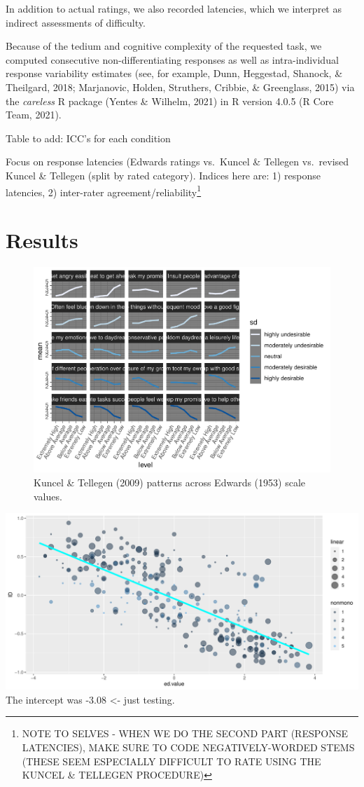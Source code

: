 \documentclass[
  english,
  ,jou]{apa6}
\begin{document}
In addition to actual ratings, we also recorded latencies, which we interpret as indirect assessments of difficulty.

Because of the tedium and cognitive complexity of the requested task, we computed consecutive non-differentiating responses as well as intra-individual response variability estimates (see, for example, Dunn, Heggestad, Shanock, \& Theilgard, 2018; Marjanovic, Holden, Struthers, Cribbie, \& Greenglass, 2015) via the \emph{careless} R package (Yentes \& Wilhelm, 2021) in R version 4.0.5 (R Core Team, 2021).

Table to add: ICC's for each condition

Focus on response latencies (Edwards ratings vs.~Kuncel \& Tellegen vs.~revised Kuncel \& Tellegen (split by rated category). Indices here are: 1) response latencies, 2) inter-rater agreement/reliability\footnote{NOTE TO SELVES - WHEN WE DO THE SECOND PART (RESPONSE LATENCIES), MAKE SURE TO CODE NEGATIVELY-WORDED STEMS (THESE SEEM ESPECIALLY DIFFICULT TO RATE USING THE KUNCEL \& TELLEGEN PROCEDURE)}

\hypertarget{results-2}{%
\section{Results}\label{results-2}}

\begin{figure}
\centering
\includegraphics{KuncelTellegen_files/figure-latex/Figure2-1.pdf}
\caption{\label{fig:Figure2}Kuncel \& Tellegen (2009) patterns across Edwards (1953) scale values.}
\end{figure}

\includegraphics{KuncelTellegen_files/figure-latex/Figure3-1.pdf}
The intercept was -3.08 \textless- just testing.
\end{document}
